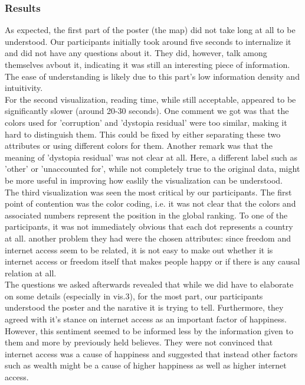 \documentclass[a4paper]{article}
\begin{document}
\subsubsection*{Results}
As expected, the first part of the poster (the map) did not take long at all to be understood. 
Our participants initially took around five seconds to internalize it and did not have any questions about it. 
They did, however, talk among themselves avbout it, indicating it was still an interesting piece of information. 
The ease of understanding is likely due to this part's low information density and intuitivity.\\
For the second visualization, reading time, while still acceptable, appeared to be significantly slower (around 20-30 seconds). One comment we got was that the colors used for 'corruption' and 'dystopia residual' were too similar, making it hard to distinguish them. 
This could be fixed by either separating these two attributes or using different colors for them.
Another remark was that the meaning of 'dystopia residual' was not clear at all.
Here, a different label such as 'other' or 'unaccounted for', while not completely true to the original data, might be more useful in improving how easlily the visualization can be understood.\\
The third visualization was seen the most critical by our participants. 
The first point of contention was the color coding, i.e. it was not clear that the colors and associated numbers represent the position in the global ranking. 
To one of the participants, it was not immediately obvious that each dot represents a country at all.
another problem they had were the chosen attributes: since freedom and internet access seem to be related, it is not easy to make out whether it is internet access or freedom itself that makes people happy or if there is any causal relation at all.\\
The questions we asked afterwards revealed that while we did have to elaborate on some details (especially in vis.3), for the most part, our participants understood the poster and the narative it is trying to tell. 
Furthermore, they agreed with it's stance on internet access as an important factor of happiness.
However, this sentiment seemed to be informed less by the information given to them and more by previously held believes.
They were not convinced that internet access was a cause of happiness and suggested that instead other factors such as wealth might be a cause of higher happiness as well as higher internet access.
\end{document}
